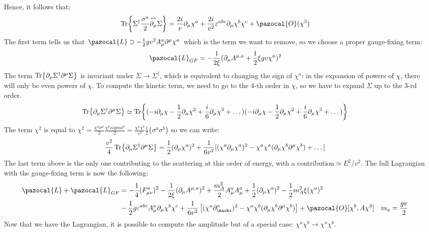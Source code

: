 \documentclass[../main.tex]{subfiles}
\begin{document}
Hence, it follows that:
\[
\Tr{\Sigma^\dagger\frac{\sigma^a}{2}\overset{\leftrightarrow}{\partial_\mu}\Sigma}=\frac{2i}{v}\partial_\mu\chi^a+\frac{2i}{v^2}\varepsilon^{abc}\partial_\mu\chi^b\chi^c+\pazocal{O}(\chi^3)
\]
The first term tells us that $\pazocal{L}\supset-\frac{1}{2}gv^2A_\mu^a\partial^\mu\chi^a$ which is the term we want to remove, so we choose a proper gauge-fixing term:
\[
\pazocal{L}_{GF}=-\frac{1}{2\xi}(\partial_\mu A^{\mu,a}+\frac{1}{2}\xi gv\chi^a)^2
\]
The term $\Tr{\partial_\mu\Sigma^\dagger\partial^\mu\Sigma}$ is invariant under $\Sigma\to\Sigma^\dagger$, which is equivalent to changing the sign of $\chi^a$: in the expansion of powers of $\chi$, there will only be even powers of $\chi$. To compute the kinetic term, we need to go to the 4-th order in $\chi$, so we have to expand $\Sigma$ up to the 3-rd order.
\[
\Tr{\partial_\mu\Sigma^\dagger\partial^\mu\Sigma}\simeq\Tr{(-i\partial_\mu\chi-\frac{1}{2}\partial_\mu\chi^2+\frac{i}{6}\partial_\mu\chi^3+\dots)(-i\partial_\mu\chi-\frac{1}{2}\partial_\mu\chi^2+\frac{i}{6}\partial_\mu\chi^3+\dots)}
\]
The term $\chi^2$ is equal to $\chi^2=\frac{\chi^a\sigma^a}{2}\frac{\chi^bsigma^b}{2}=\frac{\chi^a\chi^b}{v^2}\frac{1}{2}\{\sigma^a\sigma^b\}$ so we can write:
\[
\frac{v^2}{4}\Tr{\partial_\mu\Sigma^\dagger\partial^\mu\Sigma}=\frac{1}{2}(\partial_\mu\chi^a)^2+\frac{1}{6v^2}[(\chi^a\partial_\mu\chi^a)^2-\chi^a\chi^a(\partial_\mu\chi^b\partial^\mu\chi^b)+\dots]
\]
The last term above is the only one contributing to the scattering at this order of energy, with a contribution$\simeq E^2/v^2$. The full Lagrangian with the gauge-fixing term is now the following:
\begin{align*}
\pazocal{L}+\pazocal{L}_{GF}&=-\frac{1}{4}(F_{\mu\nu}^a)^2-\frac{1}{2\xi}(\partial_\mu A^{\mu,a})^2+\frac{m_A^2}{2}A_\mu^aA_\mu^a+\frac{1}{2}(\partial_\mu\chi^a)^2-\frac{1}{2}m_A^2\xi(\chi^a)^2\\
&-\frac{1}{2}g\varepsilon^{abc}A_\mu^a\partial_\mu\chi^b\chi^c+\frac{1}{6v^2}\left[(\chi^a\partial_\muchi^a)^2-\chi^a\chi^b(\partial_\mu\chi^b\partial^\mu\chi^b)\right]+\pazocal{O}[\chi^b,A\chi^3] \quad m_a=\frac{gv}{2}
\end{align*}
Now that we have the Lagrangian, it is possible to compute the amplitude but of a special case: $\chi^a\chi^b\to\chi^a\chi^b$.
\end{document}
